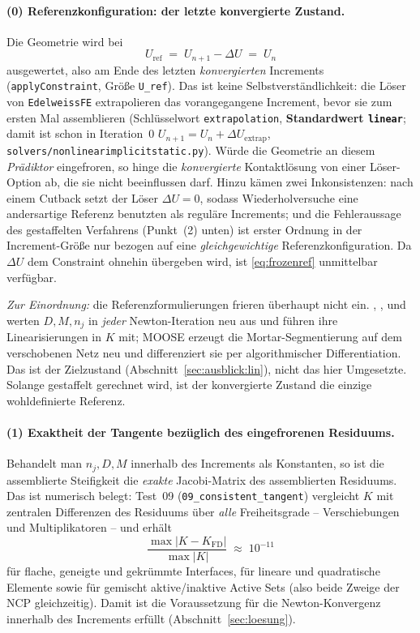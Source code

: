 \documentclass[a4paper,11pt]{article}
\def\bm#1{#1}%
\newcommand{\code}[1]{\texttt{\small #1}}
\newcommand{\file}[1]{\texttt{\small #1}}
\begin{document}
\paragraph{(0) Referenzkonfiguration: der letzte konvergierte Zustand.}
Die Geometrie wird bei
\begin{equation}
\bm U_{\text{ref}} \;=\; \bm U_{n+1} - \Delta\bm U \;=\; \bm U_n
\label{eq:frozenref}
\end{equation}
ausgewertet, also am Ende des letzten \emph{konvergierten} Increments (\code{applyConstraint},
Größe \code{U\_ref}). Das ist keine Selbstverständlichkeit: die Löser
von \code{EdelweissFE} extrapolieren das vorangegangene Increment, bevor sie zum ersten Mal
assemblieren (Schlüsselwort \code{extrapolation}, \textbf{Standardwert \code{linear}}; damit ist
schon in Iteration~0 $\bm U_{n+1}=\bm U_n+\Delta\bm U_{\text{extrap}}$,
\file{solvers/nonlinearimplicitstatic.py}). Würde die Geometrie an diesem
\emph{Prädiktor} eingefroren, so hinge die \emph{konvergierte} Kontaktlösung von einer
Löser-Option ab, die sie nicht beeinflussen darf. Hinzu kämen zwei Inkonsistenzen: nach einem
Cutback setzt der Löser $\Delta\bm U=\bm 0$, sodass Wiederholversuche eine andersartige Referenz
benutzten als reguläre Increments; und die Fehleraussage des gestaffelten Verfahrens
(Punkt~(2) unten) ist erster Ordnung in der Increment-Größe nur bezogen auf eine
\emph{gleichgewichtige} Referenzkonfiguration. Da $\Delta\bm U$ dem Constraint ohnehin übergeben
wird, ist \eqref{eq:frozenref} unmittelbar verfügbar.

\emph{Zur Einordnung:} die Referenzformulierungen frieren überhaupt nicht ein.
\citet{poppgeewall2009}, \citet{popp2010}, \citet{gitterle} und \citet[Kap.~4]{farah} werten
$\bm D,\bm M,\bm n_j$ in \emph{jeder} Newton-Iteration neu aus und führen ihre Linearisierungen in
$\bm K$ mit; MOOSE erzeugt die Mortar-Segmentierung auf dem verschobenen Netz neu und
differenziert sie per algorithmischer Differentiation. Das ist der Zielzustand
(Abschnitt~\ref{sec:ausblick:lin}), nicht das hier Umgesetzte. Solange gestaffelt gerechnet wird,
ist der konvergierte Zustand die einzige wohldefinierte Referenz.

\paragraph{(1) Exaktheit der Tangente bezüglich des eingefrorenen Residuums.}
Behandelt man $\bm n_j,\bm D,\bm M$ innerhalb des Increments als Konstanten, so ist die
assemblierte Steifigkeit die \emph{exakte} Jacobi-Matrix des assemblierten Residuums. Das ist
numerisch belegt: Test~09 (\file{09\_consistent\_tangent}) vergleicht $\bm K$ mit zentralen
Differenzen des Residuums über \emph{alle} Freiheitsgrade -- Verschiebungen und Multiplikatoren --
und erhält
\begin{equation}
\frac{\max|\bm K - \bm K_{\text{FD}}|}{\max|\bm K|} \;\approx\; 10^{-11}
\label{eq:fdcheck}
\end{equation}
für flache, geneigte und gekrümmte Interfaces, für lineare und quadratische Elemente sowie für
gemischt aktive/inaktive Active Sets (also beide Zweige der NCP gleichzeitig). Damit ist die
Voraussetzung für die Newton-Konvergenz innerhalb des Increments erfüllt
(Abschnitt~\ref{sec:loesung}).
\end{document}
